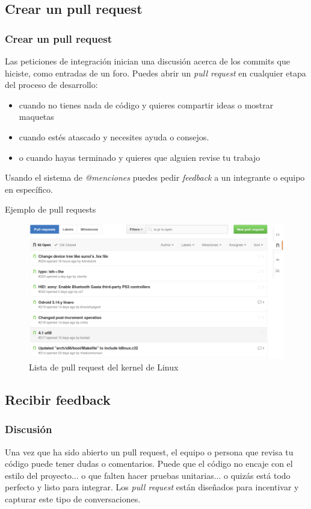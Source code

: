 \documentclass[10pt]{beamer}
\begin{document}
\subsection{Crear un pull request}
\begin{frame}[fragile]
	\frametitle{Crear un pull request}

	Las peticiones de integración inician una discusión acerca de los commits 
	que hiciste, como entradas de un foro. Puedes abrir un \emph{pull request} 
	en cualquier etapa del proceso de desarrollo:
	\begin{itemize}[<+(1)->]
		\item cuando no tienes nada de código y quieres compartir ideas o 
			mostrar maquetas
		\item cuando estés atascado y necesites ayuda o consejos.
		\item o cuando hayas terminado y quieres que alguien revise tu trabajo
	\end{itemize}
	\pause
	Usando el sistema de \emph{@menciones} puedes pedir \textit{feedback} a un 
	integrante o equipo en específico.
\end{frame}

\begin{frame}{Ejemplo de pull requests}
	\begin{figure}
		\centering
		\includegraphics[width=\textwidth]{img/pull_requests_linux.png}
		\caption{Lista de pull request del kernel de Linux}
	\end{figure}
\end{frame}

\subsection{Recibir feedback}
\begin{frame}[fragile]
	\frametitle{Discusión}

	Una vez que ha sido abierto un pull request, el equipo o persona que revisa 
	tu código puede tener dudas o comentarios.
	\pause Puede que el código no encaje con el estilo del proyecto\pause... o 
	que falten hacer pruebas unitarias\pause... o quizás está todo perfecto y 
	listo para integrar.
	\pause
	Los \textit{pull request} están diseñados para incentivar y capturar este 
	tipo de conversaciones.
\end{frame}
\end{document}
